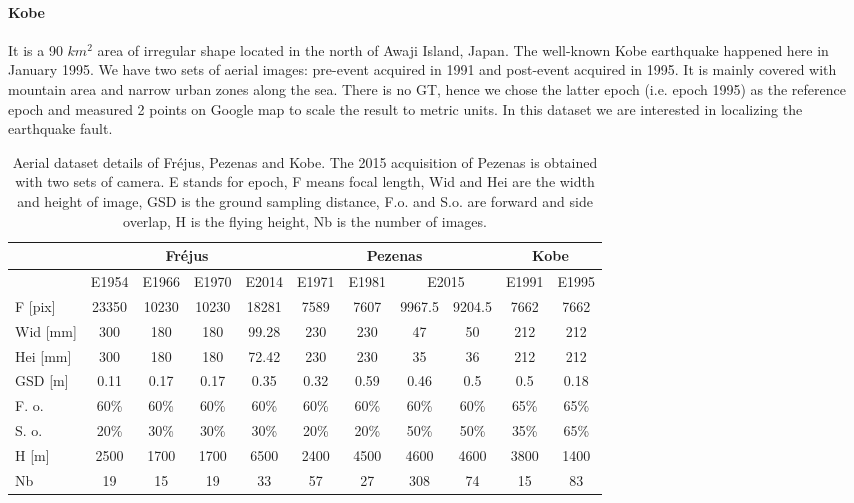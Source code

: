 \paragraph{Kobe} It is a 90 $km^2$ area of irregular shape located in the north of Awaji Island, Japan. The well-known Kobe earthquake happened here in January 1995. We have two sets of aerial images: pre-event acquired in 1991 and post-event acquired in 1995. It is mainly covered with mountain area and narrow urban zones along the sea. There is no GT, hence we chose the latter epoch (i.e. epoch 1995) as the reference epoch and measured 2 points on Google map to scale the result to metric units. In this dataset we are interested in localizing the earthquake fault.

\begin{table}[htbp]
    \scriptsize %
    \centering
    \begin{tabular}{||l|c|c|c|c||c|c|c|c||c|c||}\hline
        &\multicolumn{4}{c||}{Fr{\'e}jus}&\multicolumn{4}{c||}{Pezenas}&\multicolumn{2}{c||}{Kobe}\\\hline
                &E1954&E1966&E1970&E2014&E1971&E1981&\multicolumn{2}{c||}{E2015}&E1991&E1995\\\hline\hline
        F [pix]&23350&10230&10230&\color{black}18281&7589&7607&9967.5&9204.5&7662&7662\\
        Wid [mm]&300&180&180&99.28&230&230&47&50&212&212\\
        Hei [mm]&300&180&180&72.42&230&230&35&36&212&212\\
        GSD [m]&\color{black}0.11&\color{black}0.17&0.17&0.35&0.32&0.59&0.46&0.5&0.5&0.18\\
        F. o.&60\%&60\%&60\%&60\%&   60\%&60\%&60\%&60\%&   65\%&65\%\\
        S. o.&20\%&30\%&30\%&30\%&   20\%&20\%&50\%&50\%&   35\%&65\%\\
        H  [m]&2500&1700&1700&6500&2400&4500&4600&4600&3800&1400\\
        Nb &19&15&19&33&57&27&308&74&15&83\\\hline
    \end{tabular}
    \caption{Aerial dataset details of Fr{\'e}jus, Pezenas and Kobe. The 2015 acquisition of Pezenas is obtained with two sets of camera. E stands for epoch, F means focal length, Wid and Hei are the width and height of image, GSD is the ground sampling distance, F.o. and S.o. are forward and side overlap, H is the flying height, Nb is the number of images.}
    \label{AerialData}
\end{table}

